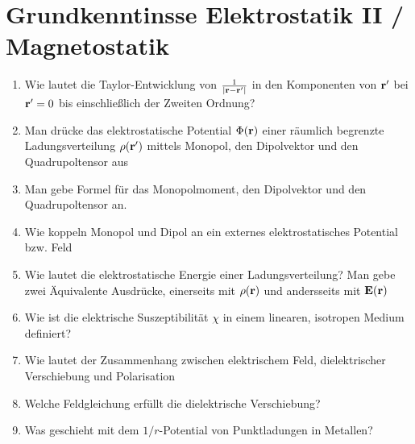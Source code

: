 \documentclass{scrartcl}
\newcommand{\rr}[1]{\frac{#1}{\abs{\vb{r}-\vb{r}'}}}
\begin{document}
  \section{Grundkenntinsse Elektrostatik II / Magnetostatik}
  \begin{enumerate}

    \item Wie lautet die Taylor-Entwicklung von $\rr{1}$ in den Komponenten
          von $\vb r'$ bei $\vb r'=0$ bis einschließlich der Zweiten
          Ordnung?\\

    \item Man drücke das elektrostatische Potential $\Phi(\vb r)$ einer
          räumlich begrenzte Ladungsverteilung $\rho(\vb r')$ mittels
          Monopol, den Dipolvektor und den Quadrupoltensor aus\\

    \item Man gebe Formel für das Monopolmoment, den Dipolvektor und den
          Quadrupoltensor an.\\

    \item Wie koppeln Monopol und Dipol an ein externes elektrostatisches
          Potential bzw. Feld\\

    \item Wie lautet die elektrostatische Energie einer Ladungsverteilung?
          Man gebe zwei Äquivalente Ausdrücke, einerseits mit $\rho(\vb r)$
          und andersseits mit $\vb E(\vb r)$\\

    \item Wie ist die elektrische Suszeptibilität $\chi$ in einem 
          linearen, isotropen Medium definiert?\\

    \item Wie lautet der Zusammenhang zwischen elektrischem Feld, 
          dielektrischer Verschiebung und Polarisation\\

    \item Welche Feldgleichung erfüllt die dielektrische Verschiebung?\\

    \item Was geschieht mit dem $1/r$-Potential von Punktladungen in
          Metallen?\\


\end{enumerate}
\end{document}
